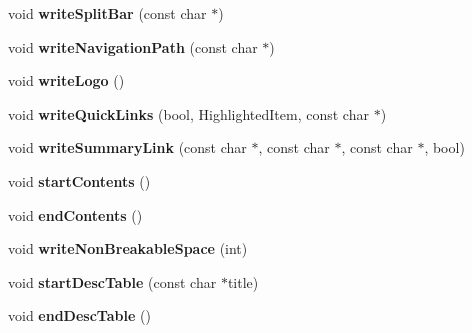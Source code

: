 \begin{DoxyCompactItemize}
\item 
\hypertarget{class_latex_generator_a465317b1419a8fc5bfb7cb94cddbfc98}{void {\bfseries write\-Split\-Bar} (const char $\ast$)}\label{class_latex_generator_a465317b1419a8fc5bfb7cb94cddbfc98}

\item 
\hypertarget{class_latex_generator_aa3b9c49f8e870752e8751d1a6c72b2c0}{void {\bfseries write\-Navigation\-Path} (const char $\ast$)}\label{class_latex_generator_aa3b9c49f8e870752e8751d1a6c72b2c0}

\item 
\hypertarget{class_latex_generator_ac7d0ac7d2abfeba04c9c22a3974221ae}{void {\bfseries write\-Logo} ()}\label{class_latex_generator_ac7d0ac7d2abfeba04c9c22a3974221ae}

\item 
\hypertarget{class_latex_generator_aa2ca76705a3c909c124824bbaee17e61}{void {\bfseries write\-Quick\-Links} (bool, Highlighted\-Item, const char $\ast$)}\label{class_latex_generator_aa2ca76705a3c909c124824bbaee17e61}

\item 
\hypertarget{class_latex_generator_ad1487847ca7844acf3cd6b0f114b651a}{void {\bfseries write\-Summary\-Link} (const char $\ast$, const char $\ast$, const char $\ast$, bool)}\label{class_latex_generator_ad1487847ca7844acf3cd6b0f114b651a}

\item 
\hypertarget{class_latex_generator_a4d02a081921a34660b9f11e7c32a303f}{void {\bfseries start\-Contents} ()}\label{class_latex_generator_a4d02a081921a34660b9f11e7c32a303f}

\item 
\hypertarget{class_latex_generator_a89af32c9958f2fc61301a25e7b3360c7}{void {\bfseries end\-Contents} ()}\label{class_latex_generator_a89af32c9958f2fc61301a25e7b3360c7}

\item 
\hypertarget{class_latex_generator_a7c7ac7747fa458bcc89aa71c0764459b}{void {\bfseries write\-Non\-Breakable\-Space} (int)}\label{class_latex_generator_a7c7ac7747fa458bcc89aa71c0764459b}

\item 
\hypertarget{class_latex_generator_a6f7fc449c9d4d715c169881f1a54eea2}{void {\bfseries start\-Desc\-Table} (const char $\ast$title)}\label{class_latex_generator_a6f7fc449c9d4d715c169881f1a54eea2}

\item 
\hypertarget{class_latex_generator_aea3e3db6190b6ec4e0f5c3988cacb40c}{void {\bfseries end\-Desc\-Table} ()}\label{class_latex_generator_aea3e3db6190b6ec4e0f5c3988cacb40c}


\end{DoxyCompactItemize}
